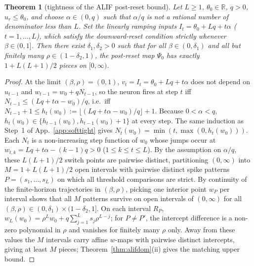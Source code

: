 \documentclass[10pt]{article}
\newtheorem{theorem}{Theorem}
\theoremstyle{remark}
\begin{document}
\begin{theorem}[tightness of the ALIF post-reset bound]
\label{thm:aliftight}
Let $L\ge1$, $\theta_0\in\mathbb R$, $q>0$, $u_r\le\theta_0$, and choose $\alpha\in(0,q)$ such that $\alpha/q$ is not a rational number of denominator less than $L$. Set the linearly ramping inputs $I_t=\theta_0+Lq+t\alpha$ ($t=1,\dots,L$), which satisfy the downward-reset condition strictly whenever $\beta\in(0,1]$. Then there exist $\delta_1,\delta_2>0$ such that for all $\beta\in(0,\delta_1)$ and all but finitely many $\rho\in(1-\delta_2,1)$, the post-reset map $\Psi_0$ has exactly $1+L(L+1)/2$ pieces on $[0,\infty)$.
\end{theorem}
\begin{proof}
At the limit $(\beta,\rho)=(0,1)$, $v_t=I_t=\theta_0+Lq+t\alpha$ does not depend on $u_{t-1}$ and $w_{t-1}=w_0+qN_{t-1}$, so the neuron fires at step $t$ iff $N_{t-1}\le (Lq+t\alpha-w_0)/q$, i.e.\ iff $N_{t-1}+1\le h_t(w_0):=\lfloor(Lq+t\alpha-w_0)/q\rfloor+1$. Because $0<\alpha<q$, $h_t(w_0)\in\{h_{t-1}(w_0),h_{t-1}(w_0)+1\}$ at every step. The same induction as Step~1 of App.~\ref{app:softtight} gives $N_t(w_0)=\min(t,\max(0,h_t(w_0)))$. Each $N_t$ is a non-increasing step function of $w_0$ whose jumps occur at $w_{t,k}=Lq+t\alpha-(k-1)q>0$ ($1\le k\le t\le L$). By the assumption on $\alpha/q$, these $L(L+1)/2$ switch points are pairwise distinct, partitioning $(0,\infty)$ into $M=1+L(L+1)/2$ open intervals with pairwise distinct spike patterns $P=(s_1,\dots,s_L)$ on which all threshold comparisons are strict. By continuity of the finite-horizon trajectories in $(\beta,\rho)$, picking one interior point $w_P$ per interval shows that all $M$ patterns survive on open intervals of $(0,\infty)$ for all $(\beta,\rho)\in(0,\delta_1)\times(1-\delta_2,1]$. On each interval $R_P$, $w_L(w_0)=\rho^Lw_0+q\sum_{j=1}^Ls_j\rho^{L-j}$; for $P\ne P'$, the intercept difference is a non-zero polynomial in $\rho$ and vanishes for finitely many $\rho$ only. Away from these values the $M$ intervals carry affine $w$-maps with pairwise distinct intercepts, giving at least $M$ pieces; Theorem~\ref{thm:alifdom}(ii) gives the matching upper bound.
\end{proof}
\end{document}
